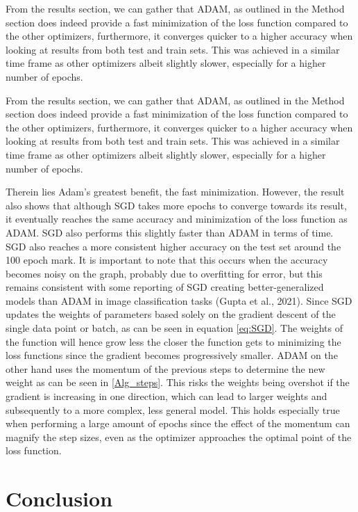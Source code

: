 \documentclass[oneside]{article}
\begin{document}
 From the results section, we can gather that ADAM, as outlined in the Method section does indeed provide a fast minimization of the loss function compared to the other optimizers, furthermore, it converges quicker to a higher accuracy when looking at results from both test and train sets. This was achieved in a similar time frame as other optimizers albeit slightly slower, especially for a higher number of epochs. \par From the results section, we can gather that ADAM, as outlined in the Method section does indeed provide a fast minimization of the loss function compared to the other optimizers, furthermore, it converges quicker to a higher accuracy when looking at results from both test and train sets. This was achieved in a similar time frame as other optimizers albeit slightly slower, especially for a higher number of epochs. \par
 Therein lies Adam's greatest benefit, the fast minimization. However, the result also shows that although SGD takes more epochs to converge towards its result, it eventually reaches the same accuracy and minimization of the loss function as ADAM. SGD also performs this slightly faster than ADAM in terms of time. SGD also reaches a more consistent higher accuracy on the test set around the 100 epoch mark. It is important to note that this occurs when the accuracy becomes noisy on the graph, probably due to overfitting for error, but this remains consistent with some reporting of SGD creating better-generalized models than ADAM in image classification tasks (Gupta et al., 2021). Since SGD updates the weights of parameters based solely on the gradient descent of the single data point or batch, as can be seen in equation \ref{eq:SGD}. The weights of the function will hence grow less the closer the function gets to minimizing the loss functions since the gradient becomes progressively smaller. ADAM on the other hand uses the momentum of the previous steps to determine the new weight as can be seen in \ref{Alg_steps}. This risks the weights being overshot if the gradient is increasing in one direction, which can lead to larger weights and subsequently to a more complex, less general model. This holds especially true when performing a large amount of epochs since the effect of the momentum can magnify the step sizes, even as the optimizer approaches the optimal point of the loss function. 
 
\newpage
\section{Conclusion}
\end{document}

